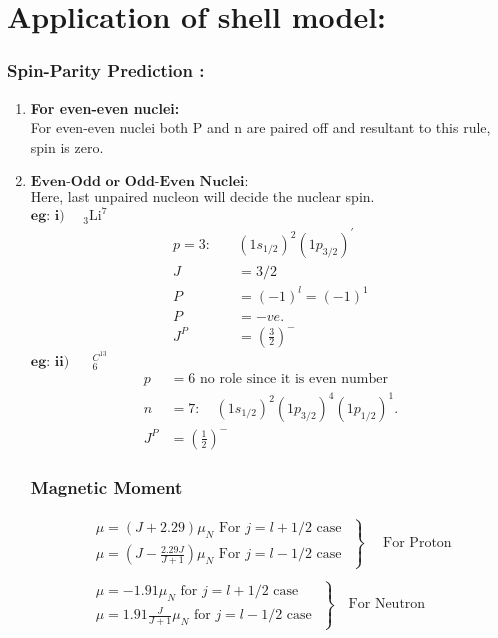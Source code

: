 \section{Application of shell model:}
\subsubsection{Spin-Parity Prediction :}
\begin{enumerate}[label=\alph*)]
	\item \textbf{For even-even nuclei:}\\ For even-even nuclei both P and n are paired off and resultant to this rule, spin is zero.
	\item $\textbf{Even-Odd or Odd-Even Nuclei:}$\\
	Here, last unpaired nucleon will decide the nuclear spin.\\
	$\textbf{eg: i) }\quad $${ }_{3} \mathrm{Li}^{7}$
	\begin{align*}
	p=3: \quad&\left(1 s_{1 / 2}\right)^{2}\left(1 p_{3 / 2}\right)^{\prime}\\
	J&=3 / 2 \\
	P&=(-1)^{l}=(-1)^{1} \\
	P&=-v e .\\
	J^{P}&=\left(\frac{3}{2}\right)^{-}
	\end{align*}
	$\textbf{eg: ii) }\quad$ ${ }_{6}^{C^{13}}$
	\begin{align*}
	p&=6 \text { no role since it is even number }\\
	n&=7: \quad\left(1 s_{1 / 2}\right)^{2}\left(1 p_{3 / 2}\right)^{4}\left(1 p_{1 / 2}\right)^{1} .\\
	J^{P}&=\left(\frac{1}{2}\right)^{-}
	\end{align*}
	\subsubsection{Magnetic Moment }
	\begin{align*}
	\left.\begin{array}{r}
	\mu=(J+2.29) \mu_{N} \text { For } j=l+1 / 2 \text { case } \\
	\mu=\left(J-\frac{2.29J}{J+1}\right) \mu_{N} \text { For } j=l-1 / 2 \text { case }
	\end{array}\right\}
	\quad\text{ For Proton}\\\\
	\left.\begin{array}{l}
	\mu=-1.91 \mu_{N} \text { for }j= l+1 / 2 \text { case } \\
	\mu= 1.91 \frac{J}{J+1} \mu_{N} \text { for } j=l-1 / 2 \text { case }
	\end{array}\right\}\quad \text{For Neutron}
	\end{align*}
\end{enumerate}
